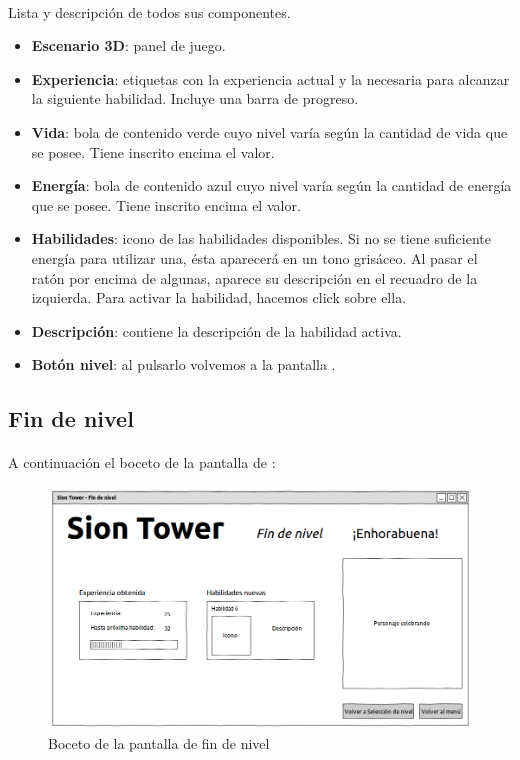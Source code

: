 \paragraph{}
Lista y descripción de todos sus componentes.

\begin{itemize}
    \item \textbf{Escenario 3D}: panel de juego.
    \item \textbf{Experiencia}: etiquetas con la experiencia actual
    y la necesaria para alcanzar la siguiente habilidad. Incluye
    una barra de progreso.
    \item \textbf{Vida}: bola de contenido verde cuyo nivel varía
    según la cantidad de vida que se posee. Tiene inscrito encima el valor.
    \item \textbf{Energía}: bola de contenido azul cuyo nivel varía
    según la cantidad de energía que se posee. Tiene inscrito encima el valor.
    \item \textbf{Habilidades}: icono de las habilidades disponibles. Si
    no se tiene suficiente energía para utilizar una, ésta aparecerá
    en un tono grisáceo. Al pasar el ratón por encima de algunas, aparece
    su descripción en el recuadro de la izquierda. Para activar la habilidad,
    hacemos click sobre ella.
    \item \textbf{Descripción}: contiene la descripción de la habilidad
    activa.
    \item \textbf{Botón nivel}: al pulsarlo volvemos a la pantalla \selnivel.
\end{itemize}

\clearpage

\subsection{Fin de nivel}
\label{sec:ui-finnivel}

\paragraph{}
A continuación el boceto de la pantalla de \finnivel:

\begin{figure}[H]
    \centering
        \includegraphics[width=\textwidth]{img/fin-nivel.png} 
    \caption{Boceto de la pantalla de fin de nivel}
    \label{img:fin-nivel}
\end{figure}

